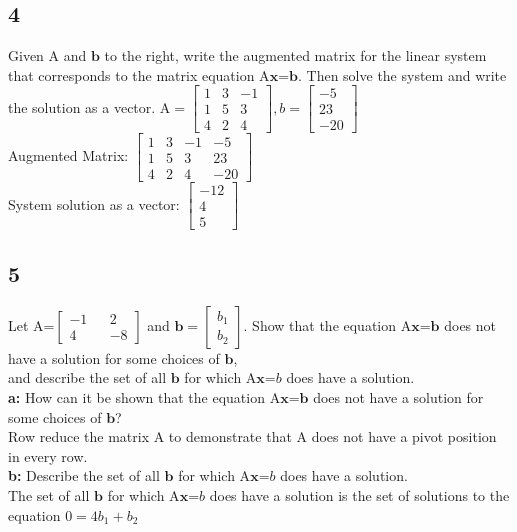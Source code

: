\documentclass{article}
\begin{document}
\subsection*{4}
Given A and $\mathbf{b}$ to the right, write the augmented matrix for the linear system that corresponds to the matrix equation A$\mathbf{x}$=$\mathbf{b}$. Then solve the system and write the solution as a vector.
A$=\begin{bmatrix}1&3&-1\\1&5&3\\4&2&4\end{bmatrix},b=\begin{bmatrix}-5\\23\\-20\end{bmatrix}$
\\[0.1in]Augmented Matrix: $\begin{bmatrix}1&3&-1&-5\\1&5&3&23\\4&2&4&-20\end{bmatrix}$
\\[0.1in]System solution as a vector: $\begin{bmatrix}-12\\4\\5\end{bmatrix}$ \pagebreak
\subsection*{5}
Let A=$\begin{bmatrix}-1&&2\\4&&-8\end{bmatrix}$ and $\mathbf{b}=\begin{bmatrix}b_1\\b_2\end{bmatrix}$. Show that the equation A$\mathbf{x}$=$\mathbf{b}$ does not have a solution for some choices of $\mathbf{b}$, \\ [0.1in]and describe the set of all $\mathbf{b}$ for which A$\mathbf{x}$=$b$ does have a solution.
\\\textbf{a:} How can it be shown that the equation A$\mathbf{x}$=$\mathbf{b}$ does not have a solution for some choices of $\mathbf{b}$?
\\Row reduce the matrix A to demonstrate that A does not have a pivot position in every row.
\\\textbf{b:} Describe the set of all $\mathbf{b}$ for which A$\mathbf{x}$=$b$ does have a solution.
\\The set of all $\mathbf{b}$ for which A$\mathbf{x}$=$b$ does have a solution is the set of solutions to the equation 
$0=4b_1+b_2$
\end{document}
